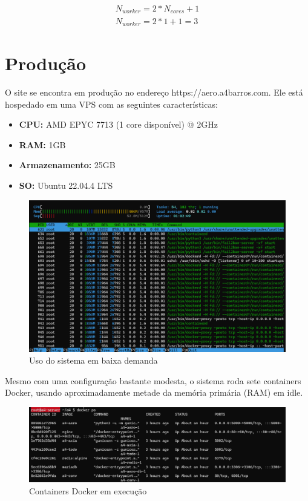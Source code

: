 \begin{equation} 
    \begin{split}
        N_{worker} = 2 * N_{cores} + 1 \\
        N_{worker} = 2 * 1 + 1 = 3 
    \end{split}
\end{equation}

\section{Produção}
O site se encontra em produção no endereço https://aero.a4barros.com. Ele está hospedado em uma VPS
com as seguintes características:

\begin{itemize}
    \item \textbf{CPU:} AMD EPYC 7713 (1 core disponível) @ 2GHz
    \item \textbf{RAM:} 1GB
    \item \textbf{Armazenamento:} 25GB
    \item \textbf{SO:} Ubuntu 22.04.4 LTS
\end{itemize}

\begin{figure}[ht]
    \begin{center}
    \includegraphics[width=400pt]{img/prod-idle.png}
    \caption{Uso do sistema em baixa demanda}
    \label{fig:prod-idle}
    \end{center}
\end{figure}

Mesmo com uma configuração bastante modesta, o sistema roda sete containers Docker, usando 
aproximadamente metade da memória primária (RAM) em idle.

\begin{figure}[ht]
    \begin{center}
    \includegraphics[width=400pt]{img/containers.png}
    \caption{Containers Docker em execução}
    \label{fig:containers}
    \end{center}
\end{figure}

